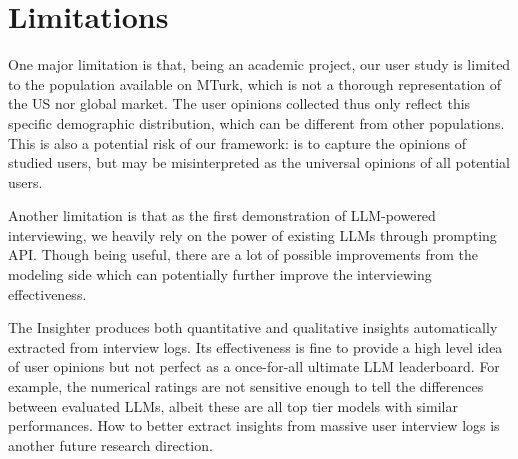 \section{Limitations}

One major limitation is that, being an academic project, our user study is limited to the population available on MTurk, which is not a thorough representation of the US nor global market. The user opinions collected thus only reflect this specific demographic distribution, which can be different from other populations. 
This is also a potential risk of our framework: \method{} is to capture the opinions of studied users, but may be misinterpreted as the universal opinions of all potential users.

Another limitation is that as the first demonstration of LLM-powered interviewing, we heavily rely on the power of existing LLMs through prompting API. Though being useful, there are a lot of possible improvements from the modeling side which can potentially further improve the interviewing effectiveness.

The Insighter produces both quantitative and qualitative insights automatically extracted from interview logs. Its effectiveness is fine to provide a high level idea of user opinions but not perfect as a once-for-all ultimate LLM leaderboard. For example, the numerical ratings are not sensitive enough to tell the differences between evaluated LLMs, albeit these are all top tier models with similar performances.
How to better extract insights from massive user interview logs is another future research direction.